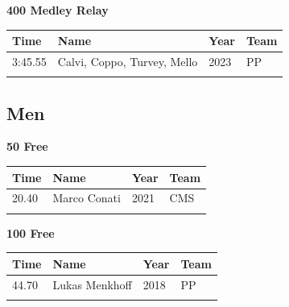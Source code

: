 \noindent\begin{minipage}[t]{0.98\textwidth}
\centering
\textbf{\textcolor{teamprimary}{400 Medley Relay}}\par
\vspace{0.5em}
\centering
\small
\renewcommand{\arraystretch}{1.0}
\setlength{\tabcolsep}{4pt}
\begin{tabular}{@{}p{2.7cm}p{4.3cm}p{1.6cm}p{2.7cm}@{}}
\toprule
\textbf{Time} & \textbf{Name} & \textbf{Year} & \textbf{Team} \\
\midrule
3:45.55 & Calvi, Coppo, Turvey, Mello & 2023 & PP \\
\bottomrule
\vspace{0.5em}
\end{tabular}
\end{minipage}
\clearpage
\subsection{Men}
\vspace{1.2em}
\noindent\begin{minipage}[t]{0.98\textwidth}
\centering
\textbf{\textcolor{teamprimary}{50 Free}}\par
\vspace{0.5em}
\centering
\small
\renewcommand{\arraystretch}{1.0}
\setlength{\tabcolsep}{4pt}
\begin{tabular}{@{}p{2.5cm}p{4.5cm}p{1.5cm}p{2.5cm}@{}}
\toprule
\textbf{Time} & \textbf{Name} & \textbf{Year} & \textbf{Team} \\
\midrule
20.40 & Marco Conati & 2021 & CMS \\
\bottomrule
\vspace{0.5em}
\end{tabular}
\end{minipage}
\vspace{1.2em}
\noindent\begin{minipage}[t]{0.98\textwidth}
\centering
\textbf{\textcolor{teamprimary}{100 Free}}\par
\vspace{0.5em}
\centering
\small
\renewcommand{\arraystretch}{1.0}
\setlength{\tabcolsep}{4pt}
\begin{tabular}{@{}p{2.5cm}p{4.5cm}p{1.5cm}p{2.5cm}@{}}
\toprule
\textbf{Time} & \textbf{Name} & \textbf{Year} & \textbf{Team} \\
\midrule
44.70 & Lukas Menkhoff & 2018 & PP \\
\bottomrule
\vspace{0.5em}
\end{tabular}
\end{minipage}

